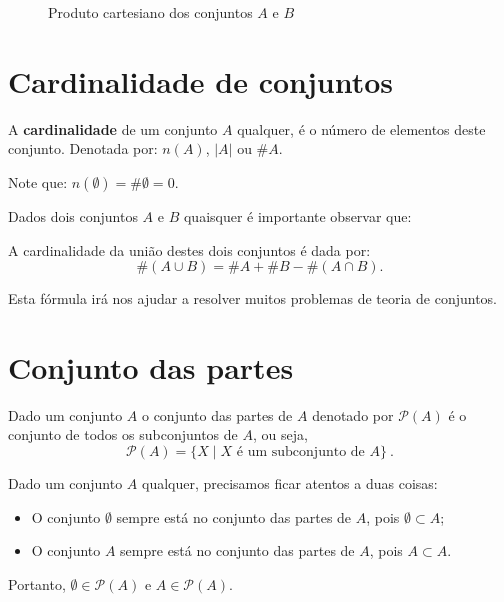 \begin{exem}
  \begin{figure}[H]
 \centering
    \caption{Produto cartesiano dos conjuntos $A$ e $B$}
  \end{figure}

 \end{exem}

\section{Cardinalidade de conjuntos}

 A \textbf{cardinalidade} de um conjunto $A$ qualquer, é o número de elementos deste conjunto. Denotada por: $n(A)$, $|A|$ ou $\# A$.

 Note que: $n(\emptyset)= \# \emptyset= 0$.

 Dados dois conjuntos $A$ e $B$ quaisquer é importante observar que:
 \vskip0.3cm
 \colorbox{azul}{
 \begin{minipage}{0.9\linewidth}
 \begin{center}
 A cardinalidade da união destes dois conjuntos é dada por:
  \[\#(A \cup B)= \# A + \# B - \#(A \cap B) .\]
 \end{center}
 \end{minipage}}
 \vskip0.3cm

 Esta fórmula irá nos ajudar a resolver muitos problemas de teoria de conjuntos.

 \section{Conjunto das partes}

 Dado um conjunto $A$ o conjunto das partes de $A$ denotado por $\mathcal{P}(A)$ é o conjunto de todos os subconjuntos de $A$, ou seja,
 \[\mathcal{P}(A)= \{X \mid X \text{ é um subconjunto de } A\} \ .\]

 Dado um conjunto $A$ qualquer, precisamos ficar atentos a duas coisas:
 \begin{itemize}
 \item O conjunto $\emptyset$ sempre está no conjunto das partes de $A$, pois $\emptyset \subset A$;
 \item O conjunto $A$ sempre está no conjunto das partes de $A$, pois $A \subset A$.
 \end{itemize}
 Portanto, $\emptyset \in \mathcal{P}(A)$ e $A \in \mathcal{P}(A)$.

